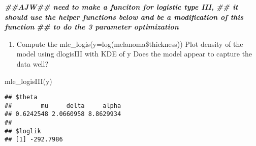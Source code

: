 \documentclass[
]{article}
\newenvironment{Shaded}{\begin{snugshade}}{\end{snugshade}}
\newcommand{\DocumentationTok}[1]{\textcolor[rgb]{0.56,0.35,0.01}{\textbf{\textit{#1}}}}
\newcommand{\FunctionTok}[1]{\textcolor[rgb]{0.00,0.00,0.00}{#1}}
\newcommand{\NormalTok}[1]{#1}
\providecommand{\tightlist}{%
  \setlength{\itemsep}{0pt}\setlength{\parskip}{0pt}}
\begin{document}
\begin{Shaded}
\begin{Highlighting}[]
\DocumentationTok{\#\#AJW\#\# need to make a funciton for logistic type III,}
\DocumentationTok{\#\# it should use the helper functions below and be a modification of this function}
\DocumentationTok{\#\# to do the 3 parameter optimization}
\end{Highlighting}
\end{Shaded}

\begin{enumerate}
\def\labelenumi{\alph{enumi})}
\setcounter{enumi}{1}
\tightlist
\item
  Compute the mle\_logis(y=log(melanoma\$thickness)) Plot density of the
  model using dlogisIII with KDE of y Does the model appear to capture
  the data well?
\end{enumerate}

\begin{Shaded}
\begin{Highlighting}[]
\FunctionTok{mle\_logisIII}\NormalTok{(y)}
\end{Highlighting}
\end{Shaded}

\begin{verbatim}
## $theta
##        mu     delta     alpha 
## 0.6242548 2.0660958 8.8629934 
## 
## $loglik
## [1] -292.7986
\end{verbatim}
\end{document}
